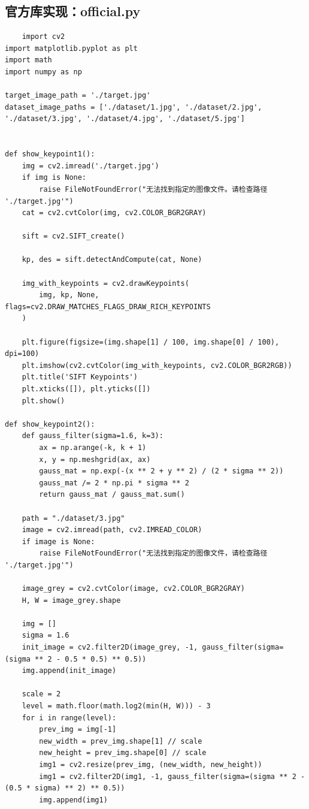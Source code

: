 \documentclass{article}
\begin{document}
\subsection{官方库实现：official.py}
\begin{lstlisting}
    import cv2
import matplotlib.pyplot as plt
import math
import numpy as np

target_image_path = './target.jpg'
dataset_image_paths = ['./dataset/1.jpg', './dataset/2.jpg', './dataset/3.jpg', './dataset/4.jpg', './dataset/5.jpg']


def show_keypoint1():
    img = cv2.imread('./target.jpg')
    if img is None:
        raise FileNotFoundError("无法找到指定的图像文件。请检查路径 './target.jpg'")
    cat = cv2.cvtColor(img, cv2.COLOR_BGR2GRAY)

    sift = cv2.SIFT_create()

    kp, des = sift.detectAndCompute(cat, None)

    img_with_keypoints = cv2.drawKeypoints(
        img, kp, None, flags=cv2.DRAW_MATCHES_FLAGS_DRAW_RICH_KEYPOINTS
    )

    plt.figure(figsize=(img.shape[1] / 100, img.shape[0] / 100), dpi=100)
    plt.imshow(cv2.cvtColor(img_with_keypoints, cv2.COLOR_BGR2RGB))
    plt.title('SIFT Keypoints')
    plt.xticks([]), plt.yticks([])
    plt.show()

def show_keypoint2():
    def gauss_filter(sigma=1.6, k=3):
        ax = np.arange(-k, k + 1)
        x, y = np.meshgrid(ax, ax)
        gauss_mat = np.exp(-(x ** 2 + y ** 2) / (2 * sigma ** 2))
        gauss_mat /= 2 * np.pi * sigma ** 2
        return gauss_mat / gauss_mat.sum()

    path = "./dataset/3.jpg"
    image = cv2.imread(path, cv2.IMREAD_COLOR)
    if image is None:
        raise FileNotFoundError("无法找到指定的图像文件，请检查路径 './target.jpg'")

    image_grey = cv2.cvtColor(image, cv2.COLOR_BGR2GRAY)
    H, W = image_grey.shape

    img = []
    sigma = 1.6
    init_image = cv2.filter2D(image_grey, -1, gauss_filter(sigma=(sigma ** 2 - 0.5 * 0.5) ** 0.5))
    img.append(init_image)

    scale = 2
    level = math.floor(math.log2(min(H, W))) - 3
    for i in range(level):
        prev_img = img[-1]
        new_width = prev_img.shape[1] // scale
        new_height = prev_img.shape[0] // scale
        img1 = cv2.resize(prev_img, (new_width, new_height))
        img1 = cv2.filter2D(img1, -1, gauss_filter(sigma=(sigma ** 2 - (0.5 * sigma) ** 2) ** 0.5))
        img.append(img1)


\end{lstlisting}
\end{document}
